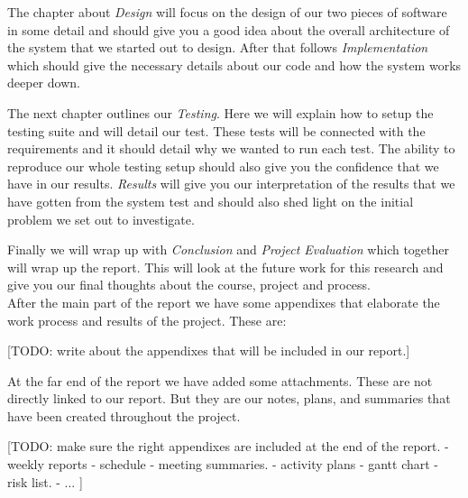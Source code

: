     The chapter about \emph{Design} will focus on the design of our two pieces of software in some detail and should give you a good idea about the overall architecture of the system that we started out to design. After that follows \emph{Implementation} which should give the necessary details about our code and how the system works deeper down.
    
    The next chapter outlines our \emph{Testing}. Here we will explain how to setup the testing suite and will detail our test. These tests will be connected with the requirements and it should detail why we wanted to run each test. The ability to reproduce our whole testing setup should also give you the confidence that we have in our results. \emph{Results} will give you our interpretation of the results that we have gotten from the system test and should also shed light on the initial problem we set out to investigate.
    
    Finally we will wrap up with \emph{Conclusion} and \emph{Project Evaluation} which together will wrap up the report. This will look at the future work for this research and give you our final thoughts about the course, project and process.
    \\
    
    After the main part of the report we have some appendixes that elaborate the work process and results of the project. These are: 
    
    [TODO: write about the appendixes that will be included in our report.]
    
    At the far end of the report we have added some attachments. These are not directly linked to our report. But they are our notes, plans, and summaries that have been created throughout the project. 
    
    [TODO: make sure the right appendixes are included at the end of the report.
    - weekly reports
    - schedule
    - meeting summaries. 
    - activity plans
    - gantt chart
    - risk list. 
    - ...
    ]\\
    
